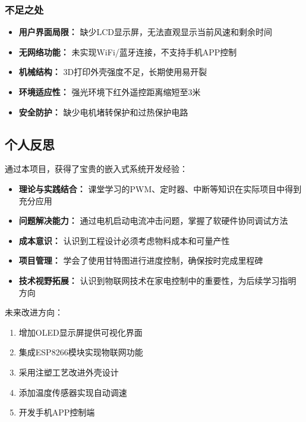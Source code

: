 \subsubsection{不足之处}
\begin{itemize}
    \item \textbf{用户界面局限：} 缺少LCD显示屏，无法直观显示当前风速和剩余时间
    \item \textbf{无网络功能：} 未实现WiFi/蓝牙连接，不支持手机APP控制
    \item \textbf{机械结构：} 3D打印外壳强度不足，长期使用易开裂
    \item \textbf{环境适应性：} 强光环境下红外遥控距离缩短至3米
    \item \textbf{安全防护：} 缺少电机堵转保护和过热保护电路
\end{itemize}

\subsection{个人反思}
通过本项目，获得了宝贵的嵌入式系统开发经验：
\begin{itemize}
    \item \textbf{理论与实践结合：} 课堂学习的PWM、定时器、中断等知识在实际项目中得到充分应用
    \item \textbf{问题解决能力：} 通过电机启动电流冲击问题，掌握了软硬件协同调试方法
    \item \textbf{成本意识：} 认识到工程设计必须考虑物料成本和可量产性
    \item \textbf{项目管理：} 学会了使用甘特图进行进度控制，确保按时完成里程碑
    \item \textbf{技术视野拓展：} 认识到物联网技术在家电控制中的重要性，为后续学习指明方向
\end{itemize}
未来改进方向：
\begin{enumerate}
    \item 增加OLED显示屏提供可视化界面
    \item 集成ESP8266模块实现物联网功能
    \item 采用注塑工艺改进外壳设计
    \item 添加温度传感器实现自动调速
    \item 开发手机APP控制端
\end{enumerate}